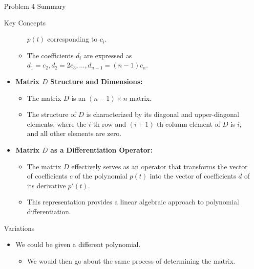 \begin{summary}{Problem 4 Summary}
\begin{statement}{Key Concepts}
\begin{itemize}
\begin{itemize}
                $p(t)$ corresponding to $c_{i}$.
                \item The coefficients $d_{i}$ are expressed as $d_{1} = c_{2}, d_{2} = 2c_{3}, \dots , d_{n - 1} = (n - 1)c_{n}$.
            \end{itemize}
            \item \textbf{Matrix $D$ Structure and Dimensions:}
            \begin{itemize}
                \item The matrix $D$ is an $(n - 1) \times n$ matrix.
                \item The structure of $D$ is characterized by its diagonal and upper-diagonal elements, where the $i$-th row and $(i + 1)$-th column element of $D$ is $i$, and all other elements are zero.
            \end{itemize}
            \item \textbf{Matrix $D$ as a Differentiation Operator:}
            \begin{itemize}
                \item The matrix $D$ effectively serves as an operator that transforms the vector of coefficients $c$ of the polynomial $p(t)$ into the vector of coefficients $d$ of its derivative $p'(t)$.
                \item This representation provides a linear algebraic approach to polynomial differentiation.
            \end{itemize}
        \end{itemize}
    \end{statement}
    \begin{statement}{Variations}
        \begin{itemize}
            \item We could be given a different polynomial.
            \begin{itemize}
                \item We would then go about the same process of determining the matrix.
            \end{itemize}
        \end{itemize}
    \end{statement}
\end{summary}

